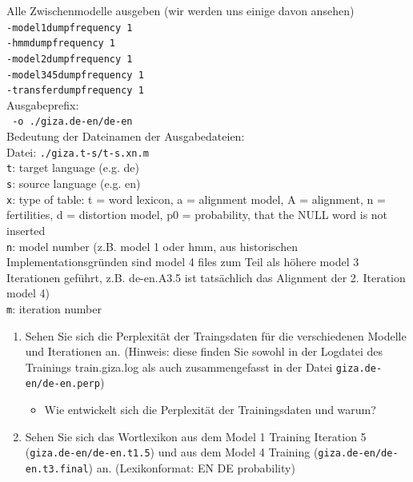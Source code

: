 \documentclass[12pt,fleqn]{article}
\begin{document}
\begin{enumerate}
Alle Zwischenmodelle ausgeben (wir werden uns einige davon ansehen)\\
\texttt{-model1dumpfrequency 1}\\
\texttt{-hmmdumpfrequency 1}\\
\texttt{-model2dumpfrequency 1}\\
\texttt{-model345dumpfrequency 1}\\
\texttt{-transferdumpfrequency 1}\\


Ausgabeprefix:\\
\texttt{	-o ./giza.de-en/de-en} \\
Bedeutung der Dateinamen der Ausgabedateien:\\
Datei: \texttt{./giza.t-s/t-s.xn.m}\\


\texttt{t}: target language (e.g. de)\\
\texttt{s}: source language (e.g. en)\\


\texttt{x}: type of table: t = word lexicon, a = alignment model, A = alignment, n = fertilities, d = distortion model, p0 = probability, that the NULL word is not inserted\\
\texttt{n}: model number (z.B. model 1 oder hmm, aus historischen Implementationsgründen sind model 4 files zum Teil als höhere model 3 Iterationen geführt, z.B. de-en.A3.5 ist tatsächlich das Alignment der 2. Iteration model 4)\\
\texttt{m}: iteration number\\


\vspace{0.5cm} 
\begin{enumerate} 
\item Sehen Sie sich die Perplexität der Traingsdaten für die verschiedenen Modelle und Iterationen an. (Hinweis: diese finden Sie sowohl in der Logdatei des Trainings train.giza.log als auch zusammengefasst in der Datei \texttt{giza.de-en/de-en.perp})

\vspace{0.5cm} 
\begin{itemize} 
\item Wie entwickelt sich die Perplexität der Trainingsdaten und warum? 
\end{itemize} 

\item Sehen Sie sich das Wortlexikon aus dem Model 1 Training Iteration 5 (\texttt{giza.de-en/de-en.t1.5}) und aus dem Model 4 Training (\texttt{giza.de-en/de-en.t3.final}) an. 
(Lexikonformat: EN DE probability) 


\end{enumerate}
\end{enumerate}
\end{document}
